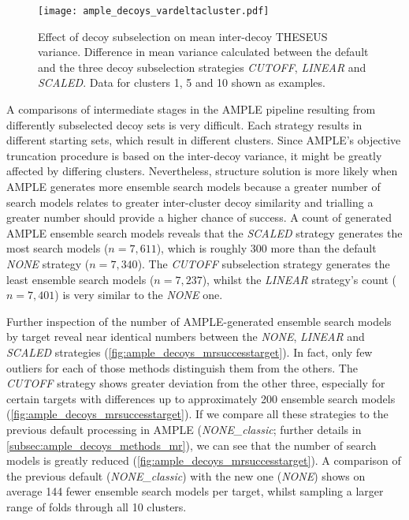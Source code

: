 \begin{figure}[H]
    \centering
    \texttt{[image: ample\_decoys\_vardeltacluster.pdf]}
    \caption[Effect of decoy subselection on THESEUS variance]{Effect of decoy subselection on mean inter-decoy THESEUS variance. Difference in mean variance calculated between the default and the three decoy subselection strategies \textit{CUTOFF}, \textit{LINEAR} and \textit{SCALED}. Data for clusters 1, 5 and 10 shown as examples.}
    \label{fig:ample_decoys_vardeltacluster}
\end{figure}

A comparisons of intermediate stages in the AMPLE pipeline resulting from differently subselected decoy sets is very difficult. Each strategy results in different starting sets, which result in different clusters. Since AMPLE's objective truncation procedure is based on the inter-decoy variance, it might be greatly affected by differing clusters. Nevertheless, structure solution is more likely when AMPLE generates more ensemble search models because a greater number of search models relates to greater inter-cluster decoy similarity and trialling a greater number should provide a higher chance of success. A count of generated AMPLE ensemble search models reveals that the \textit{SCALED} strategy generates the most search models ($n=7,611$), which is roughly 300 more than the default \textit{NONE} strategy ($n=7,340$). The \textit{CUTOFF} subselection strategy generates the least ensemble search models ($n=7,237$), whilst the \textit{LINEAR} strategy's count ($n=7,401$) is very similar to the \textit{NONE} one.

Further inspection of the number of AMPLE-generated ensemble search models by target reveal near identical numbers between the \textit{NONE}, \textit{LINEAR} and \textit{SCALED} strategies (\cref{fig:ample_decoys_mrsuccesstarget}). In fact, only few outliers for each of those methods distinguish them from the others. The \textit{CUTOFF} strategy shows greater deviation from the other three, especially for certain targets with differences up to approximately 200 ensemble search models (\cref{fig:ample_decoys_mrsuccesstarget}). If we compare all these strategies to the previous default processing in AMPLE (\textit{NONE\_classic}; further details in \cref{subsec:ample_decoys_methods_mr}), we can see that the number of search models is greatly reduced (\cref{fig:ample_decoys_mrsuccesstarget}). A comparison of the previous default (\textit{NONE\_classic}) with the new one (\textit{NONE}) shows on average 144 fewer ensemble search models per target, whilst sampling a larger range of folds through all 10 clusters.


